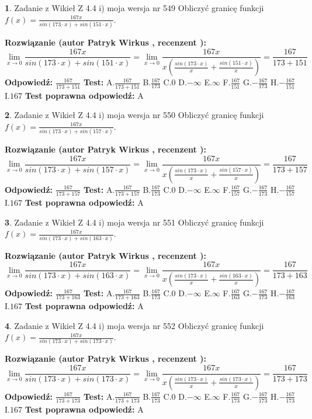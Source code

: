 \documentclass[12pt, a4paper]{article}
\theoremstyle{definition} %
\newtheorem{zad}{}
\newcommand{\zadStart}[1]{\begin{zad}#1\newline}
\newcommand{\zadStop}{\end{zad}}
\newcommand{\rozwStart}[2]{\noindent \textbf{Rozwiązanie (autor #1 , recenzent #2): }\newline}
\newcommand{\rozwStop}{\newline}
\newcommand{\odpStart}{\noindent \textbf{Odpowiedź:}\newline}
\newcommand{\odpStop}{\newline}
\newcommand{\testStart}{\noindent \textbf{Test:}\newline}
\newcommand{\testStop}{\newline}
\newcommand{\kluczStart}{\noindent \textbf{Test poprawna odpowiedź:}\newline}
\newcommand{\kluczStop}{\newline}
\begin{document}
\zadStart{Zadanie z Wikieł Z 4.4 i) moja wersja nr 549}
Obliczyć granicę funkcji $f(x)=\frac{167x}{sin(173\cdot x) +sin(151\cdot x)}$.
\zadStop
\rozwStart{Patryk Wirkus}{}
$$\lim\limits_{x\to 0}\frac{167x}{sin(173\cdot x) +sin(151\cdot x)}=\lim\limits_{x\to 0}\frac{167x}{x(\frac{sin(173\cdot x)}{x}+\frac{sin(151\cdot x)}{x})}=\frac{167}{173+151}$$
\rozwStop
\odpStart
$\frac{167}{173+151}$
\odpStop
\testStart
A.$\frac{167}{173+151}$
B.$\frac{167}{173}$
C.$0$
D.$-\infty$
E.$\infty$
F.$\frac{167}{151}$
G.$-\frac{167}{173}$
H.$-\frac{167}{151}$
I.$167$
\testStop
\kluczStart
A
\kluczStop



\zadStart{Zadanie z Wikieł Z 4.4 i) moja wersja nr 550}
Obliczyć granicę funkcji $f(x)=\frac{167x}{sin(173\cdot x) +sin(157\cdot x)}$.
\zadStop
\rozwStart{Patryk Wirkus}{}
$$\lim\limits_{x\to 0}\frac{167x}{sin(173\cdot x) +sin(157\cdot x)}=\lim\limits_{x\to 0}\frac{167x}{x(\frac{sin(173\cdot x)}{x}+\frac{sin(157\cdot x)}{x})}=\frac{167}{173+157}$$
\rozwStop
\odpStart
$\frac{167}{173+157}$
\odpStop
\testStart
A.$\frac{167}{173+157}$
B.$\frac{167}{173}$
C.$0$
D.$-\infty$
E.$\infty$
F.$\frac{167}{157}$
G.$-\frac{167}{173}$
H.$-\frac{167}{157}$
I.$167$
\testStop
\kluczStart
A
\kluczStop



\zadStart{Zadanie z Wikieł Z 4.4 i) moja wersja nr 551}
Obliczyć granicę funkcji $f(x)=\frac{167x}{sin(173\cdot x) +sin(163\cdot x)}$.
\zadStop
\rozwStart{Patryk Wirkus}{}
$$\lim\limits_{x\to 0}\frac{167x}{sin(173\cdot x) +sin(163\cdot x)}=\lim\limits_{x\to 0}\frac{167x}{x(\frac{sin(173\cdot x)}{x}+\frac{sin(163\cdot x)}{x})}=\frac{167}{173+163}$$
\rozwStop
\odpStart
$\frac{167}{173+163}$
\odpStop
\testStart
A.$\frac{167}{173+163}$
B.$\frac{167}{173}$
C.$0$
D.$-\infty$
E.$\infty$
F.$\frac{167}{163}$
G.$-\frac{167}{173}$
H.$-\frac{167}{163}$
I.$167$
\testStop
\kluczStart
A
\kluczStop



\zadStart{Zadanie z Wikieł Z 4.4 i) moja wersja nr 552}
Obliczyć granicę funkcji $f(x)=\frac{167x}{sin(173\cdot x) +sin(173\cdot x)}$.
\zadStop
\rozwStart{Patryk Wirkus}{}
$$\lim\limits_{x\to 0}\frac{167x}{sin(173\cdot x) +sin(173\cdot x)}=\lim\limits_{x\to 0}\frac{167x}{x(\frac{sin(173\cdot x)}{x}+\frac{sin(173\cdot x)}{x})}=\frac{167}{173+173}$$
\rozwStop
\odpStart
$\frac{167}{173+173}$
\odpStop
\testStart
A.$\frac{167}{173+173}$
B.$\frac{167}{173}$
C.$0$
D.$-\infty$
E.$\infty$
F.$\frac{167}{173}$
G.$-\frac{167}{173}$
H.$-\frac{167}{173}$
I.$167$
\testStop
\kluczStart
A
\kluczStop
\end{document}
